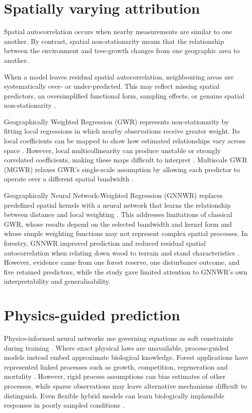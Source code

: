 \documentclass[logo,msc,ai]{infthesis}           %
\begin{document}
\section{Spatially varying attribution}
Spatial autocorrelation occurs when nearby measurements are similar to one another. By contrast, spatial non-stationarity means that the relationship between the environment and tree-growth changes from one geographic area to another. 

When a model leaves residual spatial autocorrelation, neighbouring areas are systematically over- or under-predicted. This may reflect missing spatial predictors, an oversimplified functional form, sampling effects, or genuine spatial non-stationarity \cite{gaspard2019Residual_C6_GWR}.

Geographically Weighted Regression (GWR) represents non-stationarity by fitting local regressions in which nearby observations receive greater weight. Its local coefficients can be mapped to show how estimated relationships vary across space \cite{brunsdon1996Geographically_C6_GWR}. However, local multicollinearity can produce unstable or strongly correlated coefficients, making these maps difficult to interpret \cite{wheeler2005Multicollinearity_C6_GWR}. Multiscale GWR (MGWR) relaxes GWR's single-scale assumption by allowing each predictor to operate over a different spatial bandwidth \cite{fotheringham2017Multiscale_C6_GWR}.

Geographically Neural Network-Weighted Regression (GNNWR) replaces predefined spatial kernels with a neural network that learns the relationship between distance and local weighting \cite{du2020Geographically_C6_GWR}. This addresses limitations of classical GWR, whose results depend on the selected bandwidth and kernel form and whose simple weighting functions may not represent complex spatial processes. In forestry, GNNWR improved prediction and reduced residual spatial autocorrelation when relating down wood to terrain and stand characteristics \cite{sun2022Local_C6_GWR}. However, evidence came from one forest reserve, one disturbance outcome, and five retained predictors, while the study gave limited attention to GNNWR's own interpretability and generalisability.


\section{Physics-guided prediction}
Physics-informed neural networks use governing equations as soft constraints during training \cite{raissi2019Physics_C4_NN}. Where exact physical laws are unavailable, process-guided models instead embed approximate biological knowledge. Forest applications have represented linked processes such as growth, competition, regeneration and mortality \cite{pichler2025Inferring_C4_NN}. However, rigid process assumptions can bias estimates of other processes, while sparse observations may leave alternative mechanisms difficult to distinguish. Even flexible hybrid models can learn biologically implausible responses in poorly sampled conditions \cite{pichler2025Inferring_C4_NN}.
\end{document}
